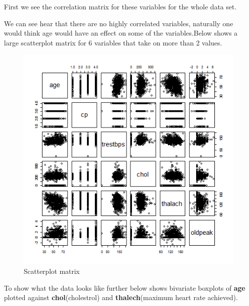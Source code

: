 \documentclass[a4paper]{article}
\begin{document}
First we see the correlation matrix for these variables for the whole data set.


We can see hear that there are no highly correlated variables, naturally one would think age would have an effect on some of the variables.Below shows a large scatterplot matrix for 6 variables that take on more than 2 values.

\begin{figure}[H]
	\begin{center}
		\includegraphics[width=12cm]{intro files/intplot2.png}
	\end{center}
	\caption{Scatterplot matrix}
\end{figure}

To show what the data looks like further below shows bivariate boxplots of \textbf{age} plotted against \textbf{chol}(cholestrol) and \textbf{thalech}(maximum heart rate achieved).
\end{document}
